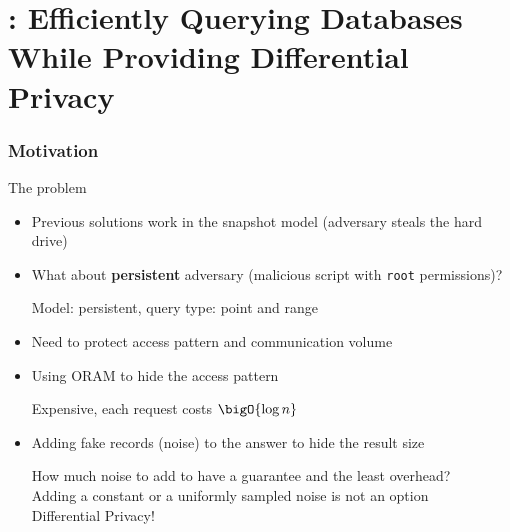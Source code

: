 \section{\epsolute{}: Efficiently Querying Databases While Providing Differential Privacy~\cite{epsolute}}

	\begin{frame}[label={frame:epsolute-motivation}]

		\frametitle{Motivation}

		\begin{block}{The problem}

			\begin{itemize}
				\item<1-> Previous solutions work in the snapshot model (adversary steals the hard drive)
				\item<1->
					What about \textbf{persistent} adversary (malicious script with \texttt{root} permissions)? \\
					\begin{small}
						\indent{} Model: \alert{persistent}, query type: \alert{point} and \alert{range}
					\end{small}
				\item<1-> Need to protect \alert{access pattern} and \alert{communication volume}
				\item<2->
					Using ORAM to hide the access pattern \\
					\begin{small}
						\indent{} Expensive, each request costs $\bigO{\log n}$ \hyperlink{frame:appendix:oram}{\beamerskipbutton{ORAM definition}}
					\end{small}
				\item<3->
					Adding fake records (noise) to the answer to hide the result size \\
					\begin{small}
						\indent{} How much noise to add to have a guarantee and the least overhead? \\
						\indent{} Adding a constant or a uniformly sampled noise is not an option \\
						\indent{} Differential Privacy!
					\end{small}
			\end{itemize}

		\end{block}

	\end{frame}

